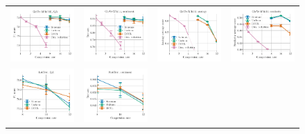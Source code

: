\begin{figure}
	\centering
	\begin{tabular}{@{\hskip -0.0in}c@{\hskip -0.0in}c@{\hskip -0.0in}c@{\hskip -0.0in}c@{\hskip -0.0in}}
		\includegraphics[width=.245\linewidth]{figures/glove400k_qa_best-f1_vs_compression_linx.pdf} &
		\includegraphics[width=.245\linewidth]{figures/glove400k_sentiment_sst_test-acc_vs_compression_linx.pdf} &
		\includegraphics[width=.245\linewidth]{figures/glove400k_intrinsics_analogy-avg-score_vs_compression_linx.pdf} &
		\includegraphics[width=.245\linewidth]{figures/glove400k_intrinsics_similarity-avg-score_vs_compression_linx.pdf} \\
		\includegraphics[width=.245\linewidth]{figures/fasttext1m_qa_best-f1_vs_compression_linx.pdf} &
		\includegraphics[width=.245\linewidth]{figures/fasttext1m_sentiment_sst_test-acc_vs_compression_linx.pdf} &

\end{tabular}
\end{figure}
